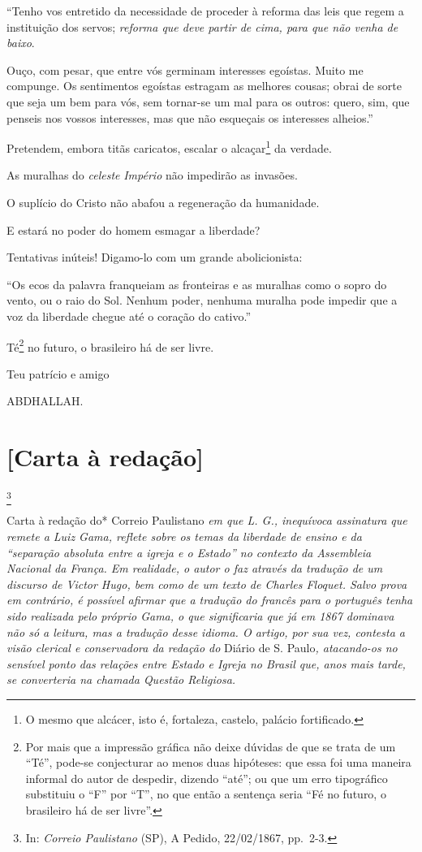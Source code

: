 ``Tenho vos entretido da necessidade de proceder à reforma das leis que
regem a instituição dos servos; \emph{reforma que deve partir de cima,
para que não venha de baixo}.

Ouço, com pesar, que entre vós germinam interesses egoístas. Muito me
compunge. Os sentimentos egoístas estragam as melhores cousas; obrai de
sorte que seja um bem para vós, sem tornar-se um mal para os outros:
quero, sim, que penseis nos vossos interesses, mas que não esqueçais os
interesses alheios.''

Pretendem, embora titãs caricatos, escalar o alcaçar\footnote{O mesmo
  que alcácer, isto é, fortaleza, castelo, palácio fortificado.} da
verdade.

As muralhas do \emph{celeste} \emph{Império} não impedirão as invasões.

O suplício do Cristo não abafou a regeneração da humanidade.

E estará no poder do homem esmagar a liberdade?

Tentativas inúteis! Digamo-lo com um grande abolicionista:

``Os ecos da palavra franqueiam as fronteiras e as muralhas como o sopro
do vento, ou o raio do Sol. Nenhum poder, nenhuma muralha pode impedir
que a voz da liberdade chegue até o coração do cativo.''

Té\footnote{Por mais que a impressão gráfica não deixe dúvidas de que
  se trata de um ``Té'', pode-se conjecturar ao menos duas hipóteses: que
  essa foi uma maneira informal do autor de despedir, dizendo ``até''; ou
  que um erro tipográfico substituiu o ``F'' por ``T'', no que então a
  sentença seria ``Fé no futuro, o brasileiro há de ser livre''.} no
futuro, o brasileiro há de ser livre.

Teu patrício e amigo

ABDHALLAH.

\chapter{{[}Carta à redação{]}}\footnote{In: \emph{Correio Paulistano} (SP),
  A Pedido, 22/02/1867, pp.~2-3.}

\begin{didascalia}
Carta à redação do* Correio Paulistano \emph{em que L. G., inequívoca
assinatura que remete a Luiz Gama, reflete sobre os temas da liberdade
de ensino e da ``separação absoluta entre a igreja e o Estado'' no
contexto da Assembleia Nacional da França. Em realidade, o autor o faz
através da tradução de um discurso de Victor Hugo, bem como de um texto
de Charles Floquet. Salvo prova em contrário, é possível afirmar que a
tradução do francês para o português tenha sido realizada pelo próprio
Gama, o que significaria que já em 1867 dominava não só a leitura, mas a
tradução desse idioma. O artigo, por sua vez, contesta a visão clerical
e conservadora da redação do} Diário de S. Paulo\emph{, atacando-os no
sensível ponto das relações entre Estado e Igreja no Brasil que, anos
mais tarde, se converteria na chamada Questão Religiosa.}
\end{didascalia}

